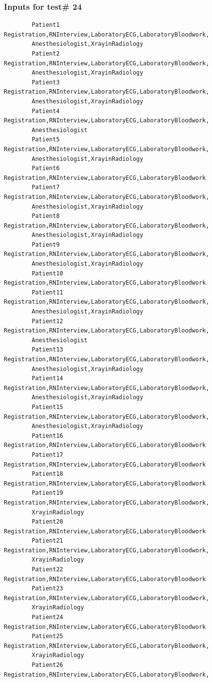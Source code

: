 \documentclass[12pt]{article}
\begin{document}
		\subsubsection{Inputs for test\# 24}
		\begin{verbatim}
		Patient1 Registration,RNInterview,LaboratoryECG,LaboratoryBloodwork,
		Anesthesiologist,XrayinRadiology
		Patient2 Registration,RNInterview,LaboratoryECG,LaboratoryBloodwork,
		Anesthesiologist,XrayinRadiology
		Patient3 Registration,RNInterview,LaboratoryECG,LaboratoryBloodwork,
		Anesthesiologist,XrayinRadiology
		Patient4 Registration,RNInterview,LaboratoryECG,LaboratoryBloodwork,
		Anesthesiologist
		Patient5 Registration,RNInterview,LaboratoryECG,LaboratoryBloodwork,
		Anesthesiologist,XrayinRadiology
		Patient6 Registration,RNInterview,LaboratoryECG,LaboratoryBloodwork
		Patient7 Registration,RNInterview,LaboratoryECG,LaboratoryBloodwork,
		Anesthesiologist,XrayinRadiology
		Patient8 Registration,RNInterview,LaboratoryECG,LaboratoryBloodwork,
		Anesthesiologist,XrayinRadiology
		Patient9 Registration,RNInterview,LaboratoryECG,LaboratoryBloodwork,
		Anesthesiologist,XrayinRadiology
		Patient10 Registration,RNInterview,LaboratoryECG,LaboratoryBloodwork
		Patient11 Registration,RNInterview,LaboratoryECG,LaboratoryBloodwork,
		Anesthesiologist,XrayinRadiology
		Patient12 Registration,RNInterview,LaboratoryECG,LaboratoryBloodwork,
		Anesthesiologist
		Patient13 Registration,RNInterview,LaboratoryECG,LaboratoryBloodwork,
		Anesthesiologist,XrayinRadiology
		Patient14 Registration,RNInterview,LaboratoryECG,LaboratoryBloodwork,
		Anesthesiologist,XrayinRadiology
		Patient15 Registration,RNInterview,LaboratoryECG,LaboratoryBloodwork,
		Anesthesiologist,XrayinRadiology
		Patient16 Registration,RNInterview,LaboratoryECG,LaboratoryBloodwork
		Patient17 Registration,RNInterview,LaboratoryECG,LaboratoryBloodwork
		Patient18 Registration,RNInterview,LaboratoryECG,LaboratoryBloodwork
		Patient19 Registration,RNInterview,LaboratoryECG,LaboratoryBloodwork,
		XrayinRadiology
		Patient20 Registration,RNInterview,LaboratoryECG,LaboratoryBloodwork
		Patient21 Registration,RNInterview,LaboratoryECG,LaboratoryBloodwork,
		XrayinRadiology
		Patient22 Registration,RNInterview,LaboratoryECG,LaboratoryBloodwork
		Patient23 Registration,RNInterview,LaboratoryECG,LaboratoryBloodwork,
		XrayinRadiology
		Patient24 Registration,RNInterview,LaboratoryECG,LaboratoryBloodwork
		Patient25 Registration,RNInterview,LaboratoryECG,LaboratoryBloodwork,
		XrayinRadiology
		Patient26 Registration,RNInterview,LaboratoryECG,LaboratoryBloodwork,

\end{verbatim}
\end{document}
